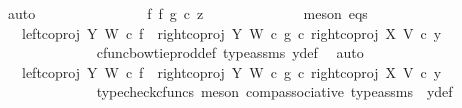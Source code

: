 \begin{isabellebody}
\ auto\isanewline
\ \ \ \ \ \ \ \ \ \ \isamarkupfalse%
\ \isamarkupfalse%
\ {\isachardoublequoteopen}{\isachardot}{\kern0pt}{\isachardot}{\kern0pt}{\isachardot}{\kern0pt}\ {\isacharequal}{\kern0pt}\ {\isacharparenleft}{\kern0pt}f\ {\isasymbowtie}\isactrlsub f\ g{\isacharparenright}{\kern0pt}\ {\isasymcirc}\isactrlsub c\ z{}{\isachardoublequoteclose}\isanewline
\ \ \ \ \ \ \ \ \ \ \ \ \isamarkupfalse%
\ {\isacharparenleft}{\kern0pt}meson\ eqs{\isacharparenright}{\kern0pt}\isanewline
\ \ \ \ \ \ \ \ \ \ \isamarkupfalse%
\ \isamarkupfalse%
\ {\isachardoublequoteopen}{\isachardot}{\kern0pt}{\isachardot}{\kern0pt}{\isachardot}{\kern0pt}\ {\isacharequal}{\kern0pt}\ {\isacharparenleft}{\kern0pt}{\isacharparenleft}{\kern0pt}left{\isacharunderscore}{\kern0pt}coproj\ Y\ W\ {\isasymcirc}\isactrlsub c\ f{\isacharparenright}{\kern0pt}\ {\isasymamalg}\ {\isacharparenleft}{\kern0pt}right{\isacharunderscore}{\kern0pt}coproj\ Y\ W\ {\isasymcirc}\isactrlsub c\ g{\isacharparenright}{\kern0pt}{\isacharparenright}{\kern0pt}\ {\isasymcirc}\isactrlsub c\ right{\isacharunderscore}{\kern0pt}coproj\ X\ V\ {\isasymcirc}\isactrlsub c\ y{}{\isachardoublequoteclose}\isanewline
\ \ \ \ \ \ \ \ \ \ \ \ \isamarkupfalse%
\ cfunc{\isacharunderscore}{\kern0pt}bowtie{\isacharunderscore}{\kern0pt}prod{\isacharunderscore}{\kern0pt}def{}\ type{\isacharunderscore}{\kern0pt}assms\ y{}{\isacharunderscore}{\kern0pt}def\ \isamarkupfalse%
\ auto\isanewline
\ \ \ \ \ \ \ \ \ \ \isamarkupfalse%
\ \isamarkupfalse%
\ {\isachardoublequoteopen}{\isachardot}{\kern0pt}{\isachardot}{\kern0pt}{\isachardot}{\kern0pt}\ {\isacharequal}{\kern0pt}\ {\isacharparenleft}{\kern0pt}{\isacharparenleft}{\kern0pt}{\isacharparenleft}{\kern0pt}left{\isacharunderscore}{\kern0pt}coproj\ Y\ W\ {\isasymcirc}\isactrlsub c\ f{\isacharparenright}{\kern0pt}\ {\isasymamalg}\ {\isacharparenleft}{\kern0pt}right{\isacharunderscore}{\kern0pt}coproj\ Y\ W\ {\isasymcirc}\isactrlsub c\ g{\isacharparenright}{\kern0pt}{\isacharparenright}{\kern0pt}\ {\isasymcirc}\isactrlsub c\ right{\isacharunderscore}{\kern0pt}coproj\ X\ V{\isacharparenright}{\kern0pt}\ {\isasymcirc}\isactrlsub c\ y{}{\isachardoublequoteclose}\isanewline
\ \ \ \ \ \ \ \ \ \ \ \ \isamarkupfalse%
\ {\isacharparenleft}{\kern0pt}typecheck{\isacharunderscore}{\kern0pt}cfuncs{\isacharcomma}{\kern0pt}\ meson\ comp{\isacharunderscore}{\kern0pt}associative{}\ type{\isacharunderscore}{\kern0pt}assms\ \ y{}{\isacharunderscore}{\kern0pt}def{\isacharparenright}{\kern0pt}\isanewline

\end{isabellebody}

